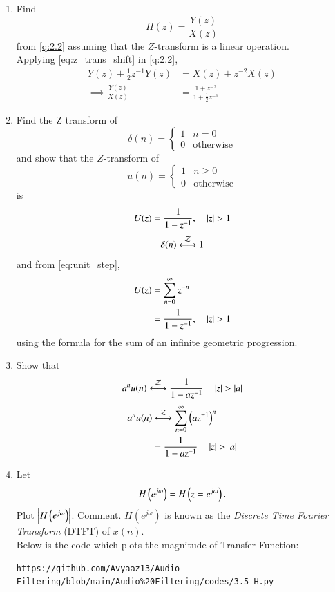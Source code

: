 \documentclass[journal,12pt,twocolumn]{IEEEtran}
\theoremstyle{remark}
\renewcommand\thesection{\arabic{section}}
\numberwithin{equation}{subsection}
\begin{document}
\begin{enumerate}[label=\thesection.\arabic*]
\item Find
%
\begin{equation}
H(z) = \frac{Y(z)}{X(z)}
\end{equation}
from  \eqref{q:2.2} assuming that the $Z$-transform is a linear operation.
\\
\solution  Applying \eqref{eq:z_trans_shift} in \eqref{q:2.2},
\begin{align}
Y(z) + \frac{1}{2}z^{-1}Y(z) &= X(z)+z^{-2}X(z)
\\
\implies \frac{Y(z)}{X(z)} &= \frac{1 + z^{-2}}{1 + \frac{1}{2}z^{-1}}
\label{eq:freq_resp}
\end{align}
%
\item Find the Z transform of 
\begin{equation}
\delta(n)
=
\begin{cases}
1 & n = 0
\\
0 & \text{otherwise}
\end{cases}
\end{equation}
and show that the $Z$-transform of
\begin{equation}
\label{eq:unit_step}
u(n)
=
\begin{cases}
1 & n \ge 0
\\
0 & \text{otherwise}
\end{cases}
\end{equation}
is
\begin{equation}
U(z) = \frac{1}{1-z^{-1}}, \quad \left\vert z\right\vert > 1
\end{equation}
\solution
\begin{equation}
\delta(n) \system{Z} 1
\end{equation}
and from \eqref{eq:unit_step},
\begin{align}
U(z) &= \sum _{n= 0}^{\infty}z^{-n}
\\
&=\frac{1}{1-z^{-1}}, \quad \left\vert z\right\vert > 1
\end{align}
using the formula for the sum of an infinite geometric progression.
%
\item Show that 
\begin{equation}
\label{eq:anun}
a^nu(n) \system{Z} \frac{1}{1-az^{-1}} \quad \abs{z} > \abs{a}
\end{equation}
\solution 
\begin{align}
	a^nu(n) &\system{Z} \sum_{n = 0}^{\infty}\brak{az^{-1}}^n \\
			&= \frac{1}{1-az^{-1}} \quad \abs{z} > \abs{a}
\end{align}
%
\item 
Let
\begin{equation}
	H\left(e^{j \omega}\right) = H\left(z = e^{j \omega}\right).
\end{equation}
Plot $\left\vert H\left(e^{j \omega}\right)\right\vert$.  Comment.  $H(e^{j \omega})$ is
known as the {\em Discrete Time Fourier Transform} (DTFT) of $x(n)$.
\\
\solution Below is the code which plots the magnitude of Transfer Function:
\begin{lstlisting}
https://github.com/Avyaaz13/Audio-Filtering/blob/main/Audio%20Filtering/codes/3.5_H.py
\end{lstlisting}



\end{enumerate}
\end{document}
